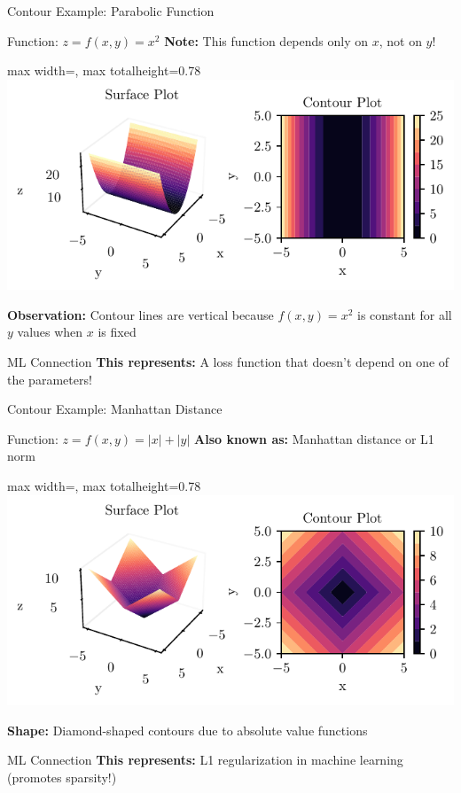 \documentclass[10pt]{beamer}
\newcommand{\fitpic}[1]{\begin{adjustbox}{max width=\linewidth, max totalheight=0.78\textheight}#1\end{adjustbox}}
\begin{document}
\begin{frame}{Contour Example: Parabolic Function}
\begin{examplebox}{Function: $z = f(x,y) = x^{2}$}
\textbf{Note:} This function depends only on $x$, not on $y$!
\end{examplebox}

\begin{center}
\fitpic{\includegraphics[width=0.8\linewidth]{../assets/mathematical-ml/figures/contour-x_squared.pdf}}
\end{center}

\begin{keypointsbox}
\textbf{Observation:} Contour lines are vertical because $f(x,y) = x^2$ is constant for all $y$ values when $x$ is fixed
\end{keypointsbox}

\begin{alertbox}{ML Connection}
\textbf{This represents:} A loss function that doesn't depend on one of the parameters!
\end{alertbox}
\end{frame}

\begin{frame}{Contour Example: Manhattan Distance}
\begin{examplebox}{Function: $z = f(x,y) = |x| + |y|$}
\textbf{Also known as:} Manhattan distance or L1 norm
\end{examplebox}

\begin{center}
\fitpic{\includegraphics[width=0.8\linewidth]{../assets/mathematical-ml/figures/contour-mod_x_plus_mod_y.pdf}}
\end{center}

\begin{keypointsbox}
\textbf{Shape:} Diamond-shaped contours due to absolute value functions
\end{keypointsbox}

\begin{alertbox}{ML Connection}
\textbf{This represents:} L1 regularization in machine learning (promotes sparsity!)
\end{alertbox}
\end{frame}
\end{document}
